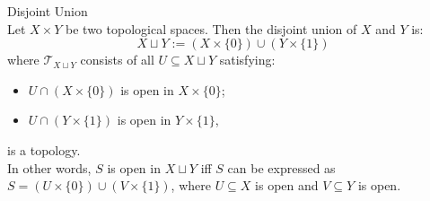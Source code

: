 \begin{definition}{Disjoint Union}\\
Let $X\times Y$ be two topological spaces. Then the disjoint union of $X$ and $Y$ is:
$$X \sqcup Y := (X \times \{0\}) \cup (Y\times \{1\})$$
where $\mathcal{T}_{X\sqcup Y}$ consists of all $U \subseteq X\sqcup Y$ satisfying:
\begin{itemize}
    \item $U \cap (X \times \{0\})$ is open in $X\times \{0\}$;
    \item $U \cap (Y \times \{1\})$ is open in $Y\times \{1\}$,
\end{itemize}
is a topology.\\
In other words, $S$ is open in $X\sqcup Y$ iff $S$ can be expressed as $S = (U \times \{0\}) \cup (V \times \{1\})$, where $U \subseteq X$ is open and $V \subseteq Y$ is open.
\end{definition}